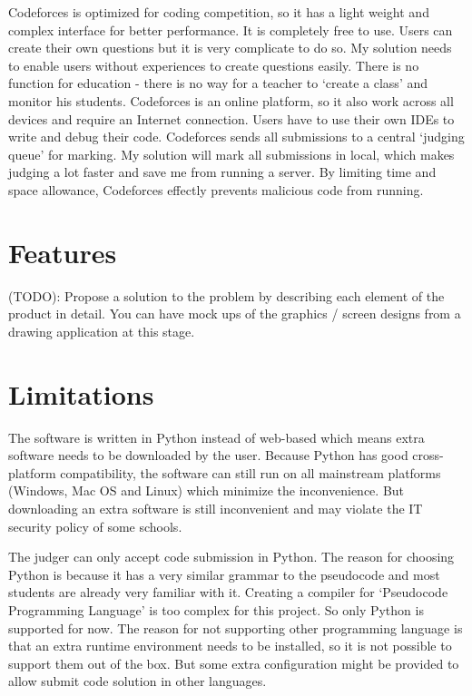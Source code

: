 \documentclass[a4paper]{report}
\begin{document}
Codeforces is optimized for coding competition, so it has a light weight and complex interface for better performance. It is completely free to use. Users can create their own questions but it is very complicate to do so. My solution needs to enable users without experiences to create questions easily. There is no function for education - there is no way for a teacher to `create a class' and monitor his students. Codeforces is an online platform, so it also work across all devices and require an Internet connection. Users have to use their own IDEs to write and debug their code. Codeforces sends all submissions to a central `judging queue' for marking. My solution will mark all submissions in local, which makes judging a lot faster and save me from running a server. By limiting time and space allowance, Codeforces effectly prevents malicious code from running.

\section{Features}

 (TODO): Propose a solution to the problem by describing each element of the product in detail.  You can have mock ups of the graphics / screen designs from a drawing application at this stage.

\section{Limitations}

The software is written in Python instead of web-based which means extra software needs to be downloaded by the user. Because Python has good cross-platform compatibility, the software can still run on all mainstream platforms (Windows, Mac OS and Linux) which minimize the inconvenience. But downloading an extra software is still inconvenient and may violate the IT security policy of some schools.

The judger can only accept code submission in Python. The reason for choosing Python is because it has a very similar grammar to the pseudocode and most students are already very familiar with it. Creating a compiler for `Pseudocode Programming Language' is too complex for this project. So only Python is supported for now. The reason for not supporting other programming language is that an extra runtime environment needs to be installed, so it is not possible to support them out of the box. But some extra configuration might be provided to allow submit code solution in other languages.
\end{document}
